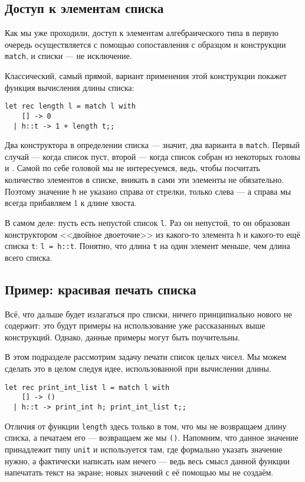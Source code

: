 \subsection{Доступ к элементам списка}

Как мы уже проходили, доступ к элементам алгебраического типа в первую очередь
осуществляется с помощью сопоставления с образцом и конструкции \verb!match!, 
и списки --- не исключение.

Классический, самый прямой, вариант применения этой конструкции покажет функция 
вычисления длины списка:

\begin{verbatim}
let rec length l = match l with
    [] -> 0
  | h::t -> 1 + length t;;
\end{verbatim}

Два конструктора в определении списка --- значит, два варианта в \verb!match!.
Первый случай --- когда список пуст, второй --- когда список собран из некоторых
головы и . Самой по себе головой мы не интересуемся, ведь, чтобы посчитать
количество элементов в списке, вникать в сами эти элементы не обязательно.
Поэтому значение \verb!h! не указано справа от стрелки, только слева --- а справа
мы всегда прибавляем 1 к длине хвоста. 

В самом деле: пусть есть непустой список \verb!l!. Раз он непустой, то он образован
конструктором <<двойное двоеточие>> из какого-то элемента \verb!h! и какого-то ещё
списка \verb!t!: \verb!l = h::t!. Понятно, что длина \verb!t! на один элемент
меньше, чем длина всего списка. 

\subsection{Пример: красивая печать списка}

Всё, что дальше будет излагаться про списки, ничего принципиально нового не содержит:
это будут примеры на использование уже рассказанных выше конструкций. Однако, 
данные примеры могут быть поучительны.

В этом подразделе рассмотрим задачу печати список целых чисел. Мы можем сделать это
в целом следуя идее, использованной при вычислении длины.

\begin{verbatim}
let rec print_int_list l = match l with
    [] -> ()
  | h::t -> print_int h; print_int_list t;;
\end{verbatim}

Отличия от функции \verb!length! здесь только в том, что мы не возвращаем длину
списка, а печатаем его --- возвращаем же мы \verb!()!. Напомним, что данное 
значение принадлежит типу \verb!unit! и используется там, где формально указать
значение нужно, а фактически написать нам нечего --- ведь весь смысл данной
функции напечатать текст на экране; новых значений с её помощью мы не создаём.

